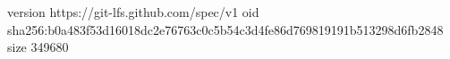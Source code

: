 version https://git-lfs.github.com/spec/v1
oid sha256:b0a483f53d16018dc2e76763c0c5b54c3d4fe86d769819191b513298d6fb2848
size 349680
